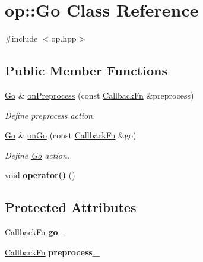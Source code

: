 \hypertarget{classop_1_1Go}{\section{op\-:\-:Go Class Reference}
\label{classop_1_1Go}
}


{\ttfamily \#include $<$op.\-hpp$>$}

\subsection*{Public Member Functions}
\begin{DoxyCompactItemize}
\item 
\hypertarget{classop_1_1Go_a23151111fb0b066e589d75c0990a4a97}{\hyperlink{classop_1_1Go}{Go} \& \hyperlink{classop_1_1Go_a23151111fb0b066e589d75c0990a4a97}{on\-Preprocess} (const \hyperlink{namespaceop_aa384cc9d57783c0a83be03e0fcbab4f4}{Callback\-Fn} \&preprocess)}\label{classop_1_1Go_a23151111fb0b066e589d75c0990a4a97}

\begin{DoxyCompactList}\small\item\em Define preprocess action. \end{DoxyCompactList}\item 
\hypertarget{classop_1_1Go_a6eb0a46f6a2518065b4b9712f4c3ecea}{\hyperlink{classop_1_1Go}{Go} \& \hyperlink{classop_1_1Go_a6eb0a46f6a2518065b4b9712f4c3ecea}{on\-Go} (const \hyperlink{namespaceop_aa384cc9d57783c0a83be03e0fcbab4f4}{Callback\-Fn} \&go)}\label{classop_1_1Go_a6eb0a46f6a2518065b4b9712f4c3ecea}

\begin{DoxyCompactList}\small\item\em Define \hyperlink{classop_1_1Go}{Go} action. \end{DoxyCompactList}\item 
\hypertarget{classop_1_1Go_a78995ff12f276329f264e1415fd55bb4}{void {\bfseries operator()} ()}\label{classop_1_1Go_a78995ff12f276329f264e1415fd55bb4}

\end{DoxyCompactItemize}
\subsection*{Protected Attributes}
\begin{DoxyCompactItemize}
\item 
\hypertarget{classop_1_1Go_a60c9fda4b6b5c34ec77ee62a2149c072}{\hyperlink{namespaceop_aa384cc9d57783c0a83be03e0fcbab4f4}{Callback\-Fn} {\bfseries go\-\_\-}}\label{classop_1_1Go_a60c9fda4b6b5c34ec77ee62a2149c072}

\item 
\hypertarget{classop_1_1Go_ad0acc646b539b3fe33d8546e94fc86dc}{\hyperlink{namespaceop_aa384cc9d57783c0a83be03e0fcbab4f4}{Callback\-Fn} {\bfseries preprocess\-\_\-}}\label{classop_1_1Go_ad0acc646b539b3fe33d8546e94fc86dc}

\end{DoxyCompactItemize}


